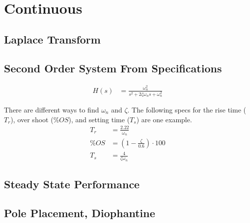 \documentclass{article}
\newcommand{\sincludepdf}[2][]{
	
}
\begin{document}

\clearpage
\section{Continuous}

\subsection{Laplace Transform}

\sincludepdf[pages={1}]{scan/11211301.pdf}

\subsection{Second Order System From Specifications}

\begin{align}
	H(s) &= \frac{\omega_n^2}{s^2 + 2 \zeta \omega_n s + \omega_n^2}
\end{align}

There are different ways to find $\omega_n$ and $\zeta$.
The following specs for the rise time ($T_r$), over shoot ($\%OS$),
and setting time ($T_s$) are one example.
\begin{align*}
	T_r &= \frac{2.22}{\omega_n} \\
	\%OS &= \left( 1 - \frac{\zeta}{0.6} \right) \cdot 100 \\
	T_s &= \frac{4}{\zeta \omega_n}
\end{align*}

\sincludepdf[pages={3},
			pagecommand=\subsubsection*{Example 1}
		]{scan/11221301.pdf}

\sincludepdf[pages={4},
			pagecommand=\subsection{Pole Placement}\subsubsection*{Example 1}
		]{scan/11221301.pdf}

\subsection{Steady State Performance}

\subsection{Pole Placement, Diophantine}
\end{document}
